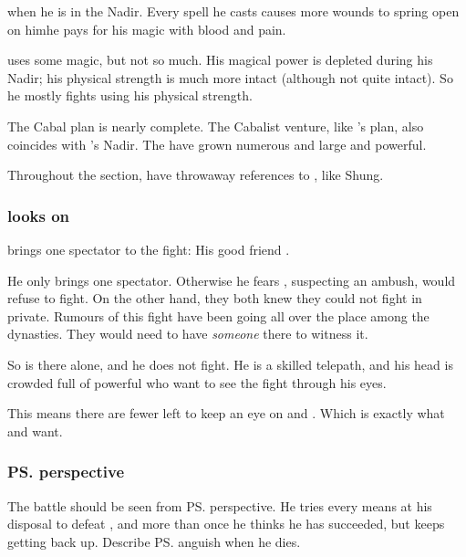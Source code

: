 \Ishnaruchaefir {} when he is in the Nadir. 
Every spell he casts causes more wounds to spring open on him\dash{}he pays for his magic with blood and pain.

\Ishnaruchaefir uses some magic, but not so much. 
His magical power is depleted during his Nadir; his physical strength is much more intact (although not quite intact). 
So he mostly fights using his physical strength. 

The Cabal plan is nearly complete. 
The Cabalist \Malcur venture, like \Secherdamon's plan, also coincides with \Ishnaruchaefir's Nadir. 
The \noggyaleth have grown numerous and large and powerful.

Throughout the section, have throwaway references to , like Shung. 




\subsubsection{\Menessiaraid looks on}
\Teshrial{} brings one spectator to the fight: 
His good friend \Menessiaraid. 

He only brings one spectator. 
Otherwise he fears \Ishnaruchaefir, suspecting an ambush, would refuse to fight. 
On the other hand, they both knew they could not fight in private. 
Rumours of this fight have been going all over the place among the dynasties. 
They would need to have \emph{someone} there to witness it. 

So \Menessiaraid{} is there alone, and he does not fight. 
He is a skilled telepath, and his head is crowded full of powerful \resphain{} who want to see the fight through his eyes. 

This means there are fewer \resphain{} left to keep an eye on \Forclin{} and \Malcur. 
Which is exactly what \Ishnaruchaefir{} and \Secherdamon{} want. 





\subsubsection{\ps{\Teshrial} perspective}
The battle should be seen from \ps{\Teshrial} perspective. 
He tries every means at his disposal to defeat \Ishnaruchaefir, and more than once he thinks he has succeeded, but \Ishnaruchaefir{} keeps getting back up. 
Describe \ps{\Teshrial} anguish when he dies. 





